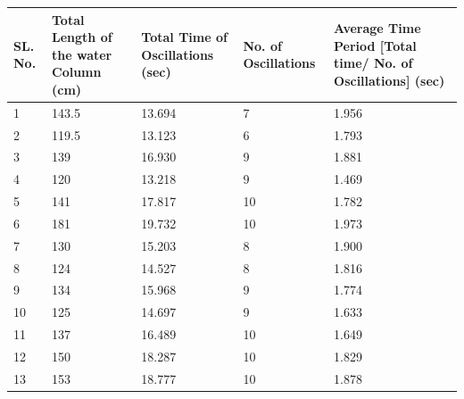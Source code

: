 \documentclass[twocolumn,11pt]{article}
\begin{document}
\begin{center}
\begin{tabular}{||p{0.5cm} | p{1.5cm}| p{1.5cm}| p{0.5cm} |p{2cm}||} 
  \hline
 SL. No. & Total Length of the water Column (cm) & Total Time of Oscillations (sec) & No. of Oscillations & Average Time Period [Total time/ No. of Oscillations] (sec) \\ [0.5ex] 
 \hline\hline
 1 & 143.5 & 13.694 & 7 & 1.956 \\ 
 \hline
 2 & 119.5 & 13.123 & 6 & 1.793 \\
 \hline
 3 & 139 & 16.930 & 9 & 1.881\\
 \hline
 4 & 120 & 13.218 & 9 & 1.469 \\
 \hline
 5 & 141 & 17.817 & 10 & 1.782\\ 
 \hline
 6 & 181 & 19.732 & 10 & 1.973\\ 
 \hline
 7 & 130 & 15.203 & 8 & 1.900\\ 
 \hline
 8 & 124 & 14.527 & 8 & 1.816\\ 
 \hline
 9 & 134 & 15.968 & 9 & 1.774\\ 
 \hline
 10 & 125 & 14.697 & 9 & 1.633\\ 
 \hline
 11 & 137 & 16.489 & 10 & 1.649\\ 
 \hline
 12 & 150 & 18.287 & 10 & 1.829\\ 
 \hline
 13 & 153 & 18.777 & 10 & 1.878\\ 
 \hline
 \hline
\end{tabular}
\end{center}
\end{document}
